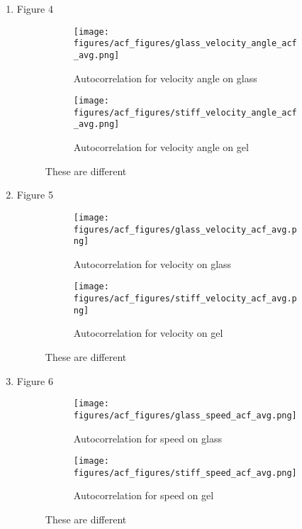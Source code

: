 \documentclass[12pt]{article}
\begin{document}
\begin{enumerate}
\item Figure 4
\begin{figure}[h!]
    \centering
    \begin{subfigure}[b]{0.4\linewidth}
      \texttt{[image: figures/acf\_figures/glass\_velocity\_angle\_acf\_avg.png]}
      \caption{Autocorrelation for velocity angle on glass}
    \end{subfigure}
    \begin{subfigure}[b]{0.4\linewidth}
      \texttt{[image: figures/acf\_figures/stiff\_velocity\_angle\_acf\_avg.png]}
      \caption{Autocorrelation for velocity angle on gel}
    \end{subfigure}
    \caption{These are different}
    \label{fig:acf_velang}
  \end{figure}

\item Figure 5
\begin{figure}[h!]
    \centering
    \begin{subfigure}[b]{0.4\linewidth}
      \texttt{[image: figures/acf\_figures/glass\_velocity\_acf\_avg.png]}
      \caption{Autocorrelation for velocity on glass}
    \end{subfigure}
    \begin{subfigure}[b]{0.4\linewidth}
      \texttt{[image: figures/acf\_figures/stiff\_velocity\_acf\_avg.png]}
      \caption{Autocorrelation for velocity on gel}
    \end{subfigure}
    \caption{These are different}
    \label{fig:acf_vel}
  \end{figure}

\item Figure 6
\begin{figure}[h!]
    \centering
    \begin{subfigure}[b]{0.4\linewidth}
      \texttt{[image: figures/acf\_figures/glass\_speed\_acf\_avg.png]}
      \caption{Autocorrelation for speed on glass}
    \end{subfigure}
    \begin{subfigure}[b]{0.4\linewidth}
      \texttt{[image: figures/acf\_figures/stiff\_speed\_acf\_avg.png]}
      \caption{Autocorrelation for speed on gel}
    \end{subfigure}
    \caption{These are different}
    \label{fig:acf_speed}
  \end{figure}


\end{enumerate}
\end{document}
